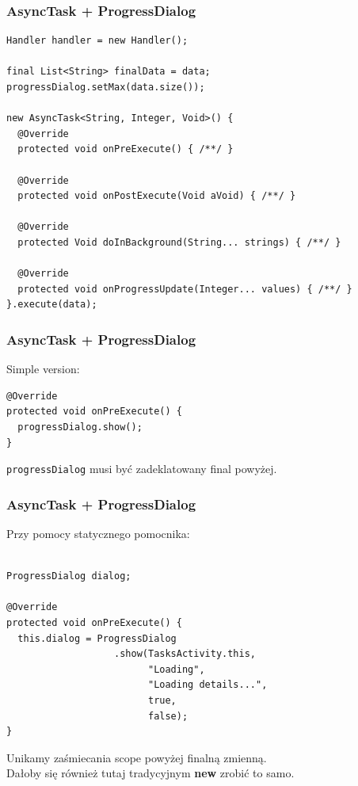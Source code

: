 
\begin{frame}[fragile]\frametitle{AsyncTask + ProgressDialog}
\begin{lstlisting}
Handler handler = new Handler();

final List<String> finalData = data;
progressDialog.setMax(data.size());

new AsyncTask<String, Integer, Void>() {
  @Override
  protected void onPreExecute() { /**/ }

  @Override
  protected void onPostExecute(Void aVoid) { /**/ }

  @Override
  protected Void doInBackground(String... strings) { /**/ }

  @Override
  protected void onProgressUpdate(Integer... values) { /**/ }
}.execute(data);
\end{lstlisting}
\end{frame}

\begin{frame}[fragile]\frametitle{AsyncTask + ProgressDialog}
Simple version: 
\begin{lstlisting}
@Override
protected void onPreExecute() {
  progressDialog.show();
}
\end{lstlisting}
\verb|progressDialog| musi być zadeklatowany final powyżej.
\end{frame}

\begin{frame}[fragile]\frametitle{AsyncTask + ProgressDialog}
Przy pomocy statycznego pomocnika:
\begin{lstlisting}

ProgressDialog dialog;

@Override
protected void onPreExecute() {
  this.dialog = ProgressDialog
                   .show(TasksActivity.this, 
                         "Loading", 
                         "Loading details...", 
                         true, 
                         false);
}
\end{lstlisting}
Unikamy zaśmiecania scope powyżej finalną zmienną.\\
Dałoby się również tutaj tradycyjnym \textbf{new} zrobić to samo.
\end{frame}


